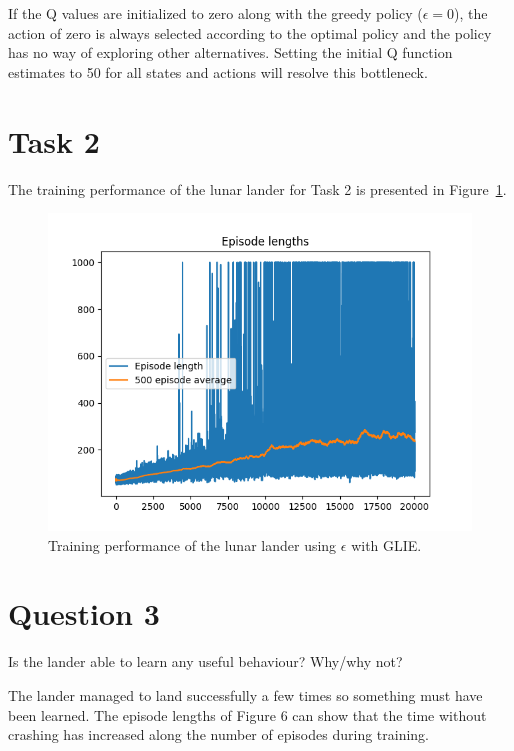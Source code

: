 \documentclass[12pt]{article}
\begin{document}
If the Q values are initialized to zero along with the greedy policy ($\epsilon=0$), the action of zero is always selected according to the optimal policy and the policy has no way of exploring other alternatives. 
Setting the initial Q function estimates to 50 for all states and actions will resolve this bottleneck.

\pagebreak

\section*{Task 2}

The training performance of the lunar lander for Task 2 is presented in Figure~\ref*{fig:fig6}.
\newline

\begin{figure}[h] 
	\centering  %
    \includegraphics[width=0.9\columnwidth]{img/Figure_7_task2_episode_reward.png}
	\caption{Training performance of the lunar lander using $\epsilon$ with GLIE.}
	\label{fig:fig6}
\end{figure}


\section*{Question 3}

Is the lander able to learn any useful behaviour? Why/why not?
\newline

The lander managed to land successfully a few times so something must have been learned.
The episode lengths of Figure 6 can show that the time without crashing has increased along the number of episodes during training.

\pagebreak




\end{document}
